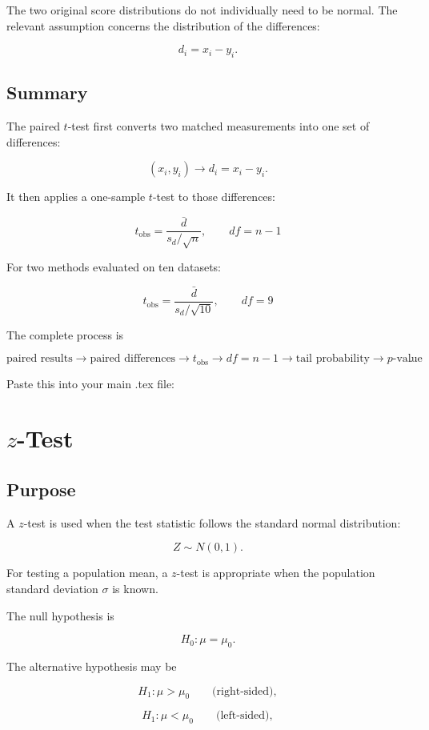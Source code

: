 \documentclass[11pt]{article}
\begin{document}
The two original score distributions do not individually need to be
normal. The relevant assumption concerns the distribution of the
differences:

\[
d_i=x_i-y_i.
\]

\subsection{Summary}

The paired \(t\)-test first converts two matched measurements into one
set of differences:

\[
(x_i,y_i)\longrightarrow d_i=x_i-y_i.
\]

It then applies a one-sample \(t\)-test to those differences:

\[
\boxed{
t_{\mathrm{obs}}
=
\frac{\bar{d}}{s_d/\sqrt{n}},
\qquad
df=n-1
}
\]

For two methods evaluated on ten datasets:

\[
\boxed{
t_{\mathrm{obs}}
=
\frac{\bar{d}}{s_d/\sqrt{10}},
\qquad
df=9
}
\]

The complete process is

\[
\boxed{
\text{paired results}
\rightarrow
\text{paired differences}
\rightarrow
t_{\mathrm{obs}}
\rightarrow
df=n-1
\rightarrow
\text{tail probability}
\rightarrow
p\text{-value}
}.
\]

Paste this into your main .tex file:

\section{\(z\)-Test}

\subsection{Purpose}

A \(z\)-test is used when the test statistic follows the standard normal
distribution:

\[
Z\sim N(0,1).
\]

For testing a population mean, a \(z\)-test is appropriate when the
population standard deviation \(\sigma\) is known.

The null hypothesis is

\[
H_0:\mu=\mu_0.
\]

The alternative hypothesis may be

\[
H_1:\mu>\mu_0
\qquad \text{(right-sided)},
\]

\[
H_1:\mu<\mu_0
\qquad \text{(left-sided)},
\]
\end{document}

